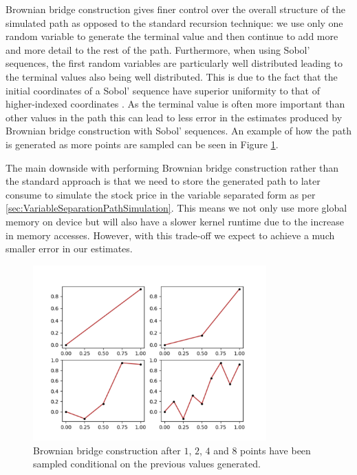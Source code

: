 Brownian bridge construction gives finer control over the overall structure of the simulated path as opposed to the standard recursion technique: we use only one random variable to generate the terminal value and then continue to add more and more detail to the rest of the path. Furthermore, when using Sobol' sequences, the first random variables are particularly well distributed leading to the terminal values also being well distributed. This is due to the fact that the initial coordinates of a Sobol' sequence have superior uniformity to that of higher-indexed coordinates \cite{glasserman2004monte}. As the terminal value is often more important than other values in the path this can lead to less error in the estimates produced by Brownian bridge construction with Sobol' sequences. An example of how the path is generated as more points are sampled can be seen in Figure \ref{fig:BrownianBridgePlots}.

The main downside with performing Brownian bridge construction rather than the standard approach is that we need to store the generated path to later consume to simulate the stock price in the variable separated form as per \ref{sec:VariableSeparationPathSimulation}. This means we not only use more global memory on device but will also have a slower kernel runtime due to the increase in memory accesses. However, with this trade-off we expect to achieve a much smaller error in our estimates.

\begin{figure}[h]
    \centering
    \includegraphics[width=0.8\textwidth]{figures/bb construction.pdf}
    \caption{Brownian bridge construction after $1$, $2$, $4$ and $8$ points have been sampled conditional on the previous values generated.}
    \label{fig:BrownianBridgePlots}
\end{figure}

